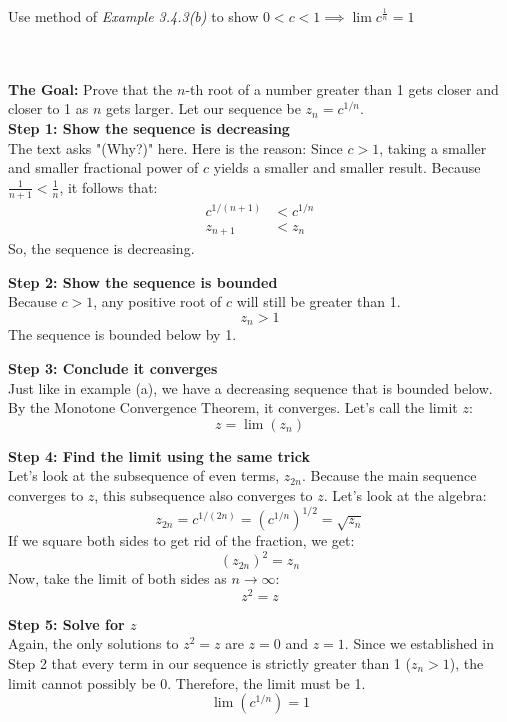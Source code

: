 \documentclass[../main.tex]{subfiles}
\begin{document}
{Use method of \textit{Example 3.4.3(b)} to show $0<c<1 \implies  \lim c^{\frac{1}{n}}=1$ }
{\\\\ \textbf{The Goal:} Prove that the $n$-th root of a number greater than 1 gets closer and closer to 1 as $n$ gets larger. Let our sequence be $z_n = c^{1/n}$. \\

\textbf{Step 1: Show the sequence is decreasing}\\
The text asks "(Why?)" here. Here is the reason: Since $c > 1$, taking a smaller and smaller fractional power of $c$ yields a smaller and smaller result. Because $\frac{1}{n+1} < \frac{1}{n}$, it follows that:
\begin{align*}
    c^{1/(n+1)} &< c^{1/n} \\
    z_{n+1} &< z_n
\end{align*}
So, the sequence is decreasing.

\textbf{Step 2: Show the sequence is bounded}\\
Because $c > 1$, any positive root of $c$ will still be greater than 1.
\begin{equation*}
    z_n > 1
\end{equation*}
The sequence is bounded below by 1.

\textbf{Step 3: Conclude it converges}\\
Just like in example (a), we have a decreasing sequence that is bounded below. By the Monotone Convergence Theorem, it converges. Let's call the limit $z$:
\begin{equation*}
    z = \lim(z_n)
\end{equation*}

\textbf{Step 4: Find the limit using the same trick}\\
Let's look at the subsequence of even terms, $z_{2n}$. Because the main sequence converges to $z$, this subsequence also converges to $z$. Let's look at the algebra:
\begin{equation*}
    z_{2n} = c^{1/(2n)} = (c^{1/n})^{1/2} = \sqrt{z_n}
\end{equation*}
If we square both sides to get rid of the fraction, we get:
\begin{equation*}
    (z_{2n})^2 = z_n
\end{equation*}
Now, take the limit of both sides as $n \to \infty$:
\begin{equation*}
    z^2 = z
\end{equation*}

\textbf{Step 5: Solve for $z$}\\
Again, the only solutions to $z^2 = z$ are $z = 0$ and $z = 1$. Since we established in Step 2 that every term in our sequence is strictly greater than 1 ($z_n > 1$), the limit cannot possibly be 0. Therefore, the limit must be 1.
\begin{equation*}
    \lim(c^{1/n}) = 1
\end{equation*}}
\end{document}
